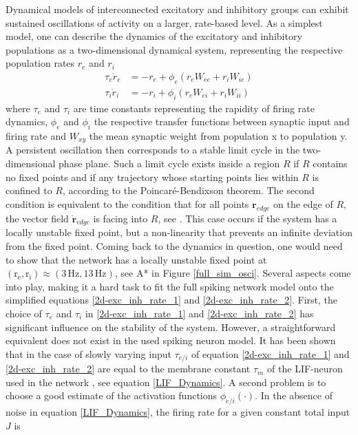 \documentclass[10pt,a4paper]{article}
\begin{document}
Dynamical models of interconnected excitatory and inhibitory groups can exhibit sustained oscillations of activity \cite[p.~270]{Theor_Neur_Dayan} on a larger, rate-based level. As a simplest model, one can describe the dynamics of the excitatory and inhibitory populations as a two-dimensional dynamical system, representing the respective population rates $r_e$ and $r_i$
\begin{align}
\tau_e \dot{r}_e  &= -r_e + \phi_e(r_e W_{ee} + r_i W_{ie}) \label{2d-exc_inh_rate_1} \\
\tau_i \dot{r}_i  &= -r_i + \phi_i(r_e W_{ei} + r_i W_{ii}) \label{2d-exc_inh_rate_2}
\end{align}
where $\tau_e$ and $\tau_i$ are time constants representing the rapidity of firing rate dynamics, $\phi_e$ and $\phi_i$ the respective transfer functions between synaptic input and firing rate and $W_{xy}$ the mean synaptic weight from population x to population y. A persistent oscillation then corresponds to a stable limit cycle in the two-dimensional phase plane. Such a limit cycle exists inside a region $R$ if $R$ contains no fixed points and if any trajectory whose starting points lies within $R$ is confined to $R$, according to the Poincaré-Bendixson theorem. The second condition is equivalent to the condition that for all points $\mathbf{r}_{edge}$ on the edge of $R$, the vector field $\dot{\mathbf{r}}_{edge}$ is facing into $R$, see \cite[p.~248]{Dyn_Sys_Hirsch}. This case occurs if the system has a locally unstable fixed point, but a non-linearity that prevents an infinite deviation from the fixed point.
Coming back to the dynamics in question, one would need to show that the network has a locally unstable fixed point at $\mathrm{(r_e,r_i)\approx (3\, Hz, 13\, Hz)}$, see A* in Figure \ref{full_sim_osci}. Several aspects come into play, making it a hard task to fit the full spiking network model onto the simplified equations \ref{2d-exc_inh_rate_1} and \ref{2d-exc_inh_rate_2}. First, the choice of $\tau_e$ and $\tau_i$ in \ref{2d-exc_inh_rate_1} and \ref{2d-exc_inh_rate_2} has significant influence on the stability of the system. However, a straightforward equivalent does not exist in the used spiking neuron model. It has been shown that in the case of slowly varying input $\tau_{e/i}$ of equation \ref{2d-exc_inh_rate_1} and \ref{2d-exc_inh_rate_2} are equal to the membrane constant $\tau_m$ of the LIF-neuron used in the network \cite{Gerstner_Pop_Act}, see equation \ref{LIF_Dynamics}. A second problem is to choose a good estimate of the activation functions $\phi_{e/i}( \cdot )$. In the absence of noise in equation \ref{LIF_Dynamics}, the firing rate for a given constant total input $J$ is
\end{document}
